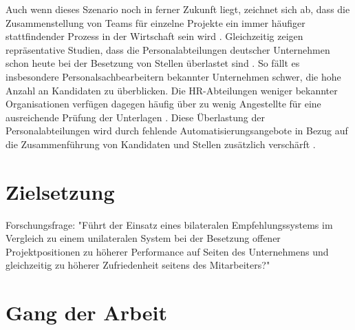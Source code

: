 Auch wenn dieses Szenario noch in ferner Zukunft liegt, zeichnet sich ab, dass die Zusammenstellung von Teams für einzelne Projekte ein immer häufiger stattfindender Prozess in der Wirtschaft sein wird \cite[S. 2]{malinowski:2008}. Gleichzeitig zeigen repräsentative Studien, dass die Personalabteilungen deutscher Unternehmen schon heute bei der Besetzung von Stellen überlastet sind \cite[S. 244]{personalbeschaffung:2017}. So fällt es insbesondere Personalsachbearbeitern bekannter Unternehmen schwer, die hohe Anzahl an Kandidaten zu überblicken. Die HR-Abteilungen weniger bekannter Organisationen verfügen dagegen häufig über zu wenig Angestellte für eine ausreichende Prüfung der Unterlagen \cite[S. 8]{hays:2013}. Diese Überlastung der Personalabteilungen wird durch fehlende Automatisierungsangebote in Bezug auf die Zusammenführung von Kandidaten und Stellen zusätzlich verschärft \cite[S. 15]{hays:2013}.

\section{Zielsetzung}
\label{sec:intro:zielsetzung}
Forschungsfrage: "Führt der Einsatz eines bilateralen Empfehlungssystems im Vergleich zu einem unilateralen System bei der Besetzung offener Projektpositionen zu höherer Performance auf Seiten des Unternehmens und gleichzeitig zu höherer Zufriedenheit seitens des Mitarbeiters?"

\section{Gang der Arbeit}
\label{sec:intro:gangDerArbeit}

